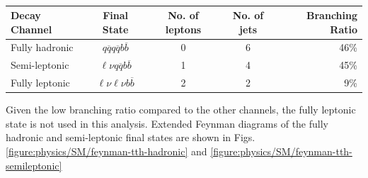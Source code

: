 \begin{table}[h]
\centering
	\begin{tabular}{ l c c c r }
	\hline \hline
	Decay Channel & Final State & No. of leptons & No. of jets & Branching Ratio \\ \hline
	Fully hadronic & $q\overline{q}q\overline{q}b\overline{b}$ & 0 & 6 & 46\% \\
	Semi-leptonic &  $\ell \nu q\overline{q}b\overline{b}$ & 1 & 4 & 45\% \\
	Fully leptonic & $\ell \nu \ell \nu b\overline{b}$ & 2 & 2 & 9\% \\ \hline \hline
	\end{tabular}
	\caption{ }
	\label{table:physics/final-states}
\end{table}

Given the low branching ratio compared to the other channels, the fully leptonic state is not used in this analysis. Extended Feynman diagrams of the fully hadronic and semi-leptonic final states are shown in Figs. \ref{figure:physics/SM/feynman-tth-hadronic} and \ref{figure:physics/SM/feynman-tth-semileptonic}


